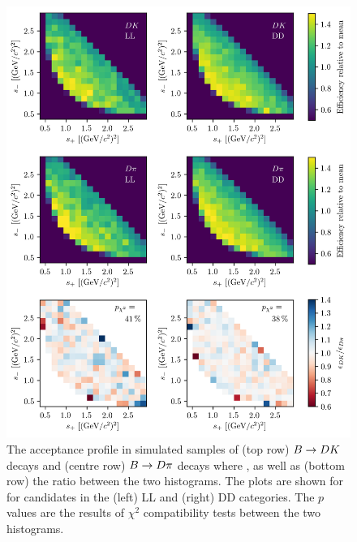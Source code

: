 \begin{figure}[tbp]
    \centering
    \includegraphics[width=\columnwidth]{figures/analysis/DP_thesis_m2_chi2_PiPi_LLandDD.png}
    \caption{The acceptance profile in simulated samples of (top row)  ${B}\rightarrow{\ensuremath{D}}{\ensuremath{K}}$ decays and (centre row)  ${B}\rightarrow{\ensuremath{D}}\pi$ decays where \DtoKspipi, as well as (bottom row) the ratio between the two histograms. The plots are shown for for candidates in the (left) LL and (right) DD categories. The $p$ values are the results of $\chi^2$ compatibility tests between the two histograms.}
    \label{fig:dk_vs_dpi_chi2_pipi}
\end{figure}

